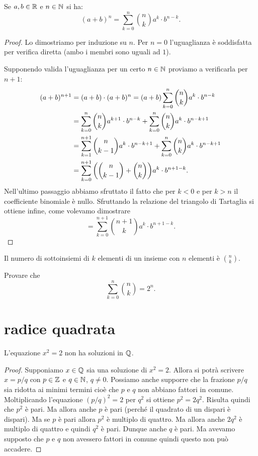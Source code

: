 \begin{theorem}
\mymark{***}
Se $a,b\in \mathbb R$ e $n\in \mathbb N$ si ha:
\[
(a+b)^n = \sum_{k=0}^n {n \choose k} a^k \cdot b^{n-k}.
\]
\end{theorem}
%
\begin{proof}
Lo dimostriamo per induzione su $n$.
Per $n=0$ l'uguaglianza è soddisfatta per verifica diretta (ambo i membri sono uguali ad $1$).

Supponendo valida l'uguaglianza per un certo $n\in \mathbb N$ proviamo a verificarla
per $n+1$:
\begin{align*}
(a+b)^{n+1}
&= (a+b)\cdot (a+b)^n
 = (a+b) \sum_{k=0}^n {n \choose k} a^k \cdot b^{n-k}\\
&= \sum_{k=0}^n {n \choose k} a^{k+1}\cdot b^{n-k}
   + \sum_{k=0}^n {n \choose k} a^k \cdot b^{n-k+1} \\
&= \sum_{k=1}^{n+1} {n \choose k-1} a^k \cdot b^{n-k+1}
   + \sum_{k=0}^n {n \choose k}a^k \cdot b^{n-k+1} \\
&= \sum_{k=0}^{n+1} {\left( {n \choose k-1} + {n \choose k} \right)} a^k \cdot b^{n+1-k}.
\end{align*}
Nell'ultimo passaggio abbiamo sfruttato il fatto che per $k<0$ e per $k>n$ il coefficiente binomiale è nullo.
Sfruttando la relazione del triangolo di Tartaglia si ottiene infine,
come volevamo dimostrare
\[
  = \sum_{k=0}^{n+1}{n+1 \choose k} a^k \cdot b^{n+1-k}.
\]
\end{proof}

\begin{exercise}
Il numero di sottoinsiemi di $k$ elementi di un insieme con $n$ elementi
è ${n\choose k}$.
\end{exercise}

\begin{exercise}
Provare che
\[
 \sum_{k=0}^n {n \choose k} = 2^n.
\]
\end{exercise}

\section{radice quadrata}
\label{sec:radice_quadrata}

\begin{theorem}
\mymark{**}%
\label{th:pitagora}
L'equazione $x^2=2$ non ha soluzioni in $\mathbb Q$.
\end{theorem}
%
\begin{proof}
\mymark{*}
Supponiamo $x\in \mathbb Q$ sia una soluzione di $x^2=2$.
Allora si potrà scrivere $x=p/q$ con $p\in \mathbb Z$ e $q\in \mathbb N$, $q\neq 0$.
Possiamo anche supporre che la frazione $p/q$ sia ridotta ai minimi
termini cioè che $p$ e $q$ non abbiano fattori in comune.
Moltiplicando l'equazione
$(p/q)^2=2$ per $q^2$ si ottiene $p^2 = 2 q^2$.
Risulta quindi che $p^2$ è pari.
Ma allora anche $p$ è pari (perché il quadrato di un dispari è dispari).
Ma se $p$ è pari allora $p^2$ è multiplo di quattro.
Ma allora anche $2q^2$ è multiplo di quattro e quindi $q^2$ è pari.
Dunque anche $q$ è pari. Ma avevamo supposto che $p$ e $q$ non avessero
fattori in comune quindi questo non può accadere.
\end{proof}

